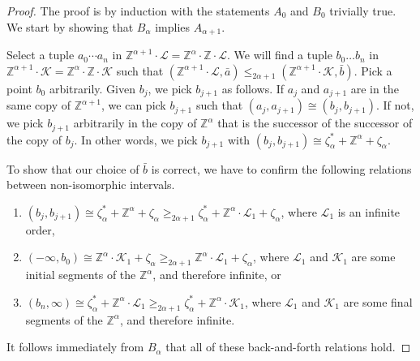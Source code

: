 \documentclass[10pt,a4paper]{amsart}
\providecommand{\tightlist}{%
  \setlength{\itemsep}{0pt}\setlength{\parskip}{0pt}}
\providecommand{\L}{\mathcal{L}}
\providecommand{\ba}{\bar a}
\providecommand{\bb}{\bar b}
\newcommand{\Z}{\mathbb{Z}}
\newcommand{\K}{\mathcal{K}}
\renewcommand{\L}{\mathcal{L}}
\begin{document}
\begin{proof}
    The proof is by induction with the statements $A_0$ and $B_0$ trivially true.
    We start by showing that $B_\alpha$ implies $A_{\alpha+1}$. 

    Select a tuple $a_0\cdots a_n$ in $\Z^{\alpha+1}\cdot \L=\Z^\alpha\cdot\Z\cdot
    \L$. We will find a tuple $b_0\dots b_n$ in $\Z^{\alpha+1}\cdot
    \K=\Z^\alpha\cdot\Z\cdot \K$ such that $(\Z^{\alpha+1}\cdot \L,\ba
    )\leq_{2\alpha+1} (\Z^{\alpha+1}\cdot \K,\bb)$. Pick a point $b_0$ arbitrarily.
    Given $b_j$, we pick $b_{j+1}$ as follows. If $a_j$ and $a_{j+1}$ are in the
    same copy of $\Z^{\alpha+1}$, we can pick $b_{j+1}$ such that
    $(a_j,a_{j+1})\cong(b_j,b_{j+1})$. If not, we pick $b_{j+1}$
    arbitrarily in the copy of $\Z^{\alpha}$ that is the successor of the successor
    of the copy of $b_j$. In other words, we pick $b_{j+1}$ with  $(b_j,b_{j+1})\cong \zeta^*_\alpha +\Z^\alpha+\zeta_\alpha$.
    
To show that our choice of $\bb$ is correct, we have to confirm the following
relations between non-isomorphic intervals.
\begin{enumerate}\tightlist
\item $(b_j,b_{j+1})\cong \zeta^*_\alpha +\Z^\alpha+\zeta_\alpha \geq_{2\alpha+1} \zeta^*_\alpha
    +\Z^\alpha\cdot \L_1+\zeta_\alpha$, where $\L_1$ is an infinite order,
\item $(-\infty,b_0)\cong \Z^\alpha\cdot \K_1+\zeta_\alpha \geq_{2\alpha+1}\Z^\alpha\cdot
    \L_1+\zeta_\alpha$, where $\L_1$ and $\K_1$ are some initial segments of the $\Z^\alpha$, and therefore infinite, or
\item $(b_{n},\infty)\cong\zeta^*_\alpha +\Z^\alpha\cdot \L_1 \geq_{2\alpha+1} \zeta^*_\alpha
    +\Z^\alpha\cdot \K_1$, where $\L_1$ and $\K_1$ are some final segments of the $\Z^\alpha$, and therefore infinite.
\end{enumerate} 
It follows immediately from $B_\alpha$ that all of these back-and-forth relations hold.


\end{proof}
\end{document}
